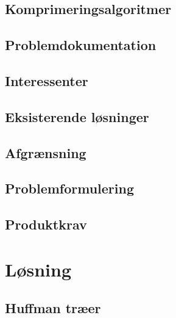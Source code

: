 \documentclass[12pt,a4paper]{report}
\begin{document}
	\section{Komprimeringsalgoritmer}
	
	
	\section{Problemdokumentation}
	
	
	\section{Interessenter}
	

	\section{Eksisterende løsninger}
	

	\section{Afgrænsning}
	

	\section{Problemformulering}
		
	
	\section{Produktkrav}
	
	



\chapter{Løsning}

  

	\section{Huffman træer}
	\label{huffman_traer}
	
\end{document}
